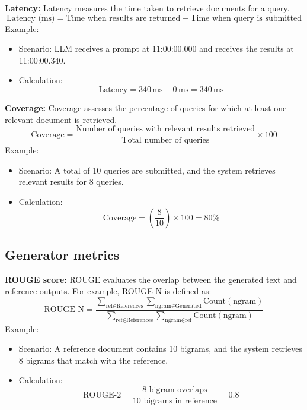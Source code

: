 \textbf{Latency:}
    Latency measures the time taken to retrieve documents for a query.
    \[
    \text{Latency (ms)} = \text{Time when results are returned} - \text{Time when query is submitted}
    \]
    Example:
    \begin{itemize}
        \item Scenario: LLM receives a prompt at 11:00:00.000 and receives the results at 11:00:00.340.
    
        \item Calculation:
        \begin{equation*}
        \text{Latency} = 340 \, \text{ms} - 0 \, \text{ms} = 340 \, \text{ms}
        \end{equation*}

    \end{itemize}

\textbf{Coverage:}
    Coverage assesses the percentage of queries for which at least one relevant document is retrieved.
    \[
    \text{Coverage} = \frac{\text{Number of queries with relevant results retrieved}}{\text{Total number of queries}} \times 100
    \]
    Example:
    \begin{itemize}
        \item Scenario: A total of 10 queries are submitted, and the system retrieves relevant results for 8 queries.
        
        \item Calculation:
        \begin{equation*}
        \text{Coverage} = \left( \frac{8}{10} \right) \times 100 = 80\%
        \end{equation*}
        
    \end{itemize}

\subsection{Generator metrics}
\textbf{ROUGE score:}
    ROUGE evaluates the overlap between the generated text and reference outputs. For example, ROUGE-N is defined as:
    \[
    \text{ROUGE-N} = \frac{\sum_{\text{ref} \in \text{References}} \sum_{\text{ngram} \in \text{Generated}} \text{Count}(\text{ngram})}{\sum_{\text{ref} \in \text{References}} \sum_{\text{ngram} \in \text{ref}} \text{Count}(\text{ngram})}
    \]
    Example:
    \begin{itemize}
        \item Scenario: A reference document contains 10 bigrams, and the system retrieves 8 bigrams that match with the reference.

        \item Calculation:
        \begin{equation*}
        \text{ROUGE-2} = \frac{\text{8 bigram overlaps}}{\text{10 bigrams in reference}} = 0.8
        \end{equation*}        
    \end{itemize}

